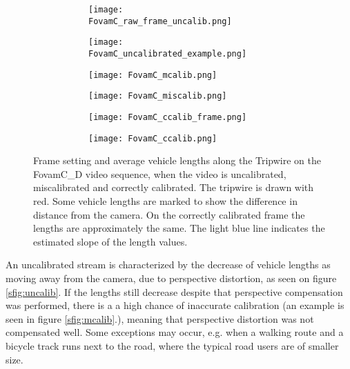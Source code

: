 \begin{figure}[!t]
	\centering
	\begin{subfigure}[b]{\textwidth}
		\begin{subfigure}[t]{0.45\textwidth}
		\texttt{[image: FovamC\_raw\_frame\_uncalib.png]}
		\end{subfigure}
	\quad
		\begin{subfigure}[t]{0.375\textwidth}
		\texttt{[image: FovamC\_uncalibrated\_example.png]}
		\end{subfigure}
	\end{subfigure}
	\hfill
	\begin{subfigure}[b]{\textwidth}
		\begin{subfigure}[t]{0.45\textwidth}
			\texttt{[image: FovamC\_mcalib.png]}
		\end{subfigure}
		\quad
		\begin{subfigure}[t]{0.375\textwidth}
			\texttt{[image: FovamC\_miscalib.png]}
		\end{subfigure}
	\end{subfigure}
	\hfill
	\begin{subfigure}[b]{\textwidth}
		\begin{subfigure}[t]{0.45\textwidth}
			\texttt{[image: FovamC\_ccalib\_frame.png]}
		\end{subfigure}
		\quad
		\begin{subfigure}[t]{0.375\textwidth}
			\texttt{[image: FovamC\_ccalib.png]}
		\end{subfigure}
	\end{subfigure}

	\caption{Frame setting and average vehicle lengths along the Tripwire on the FovamC\_D video sequence, when the video is uncalibrated, miscalibrated and correctly calibrated. The tripwire is drawn with red. Some vehicle lengths are marked to show the difference in distance from the camera. On the correctly calibrated frame the lengths are approximately the same. The light blue line indicates the estimated slope of the length values.\label{fig:calibration_versions}}
\end{figure}

An uncalibrated stream is characterized by the decrease of vehicle lengths as moving away from the camera, due to perspective distortion, as seen on figure \ref{sfig:uncalib}.
If the lengths still decrease despite that perspective compensation was performed, there is a a high chance of inaccurate calibration (an example is seen in figure \ref{sfig:mcalib}.), meaning that perspective distortion was not compensated well.
Some exceptions may occur, e.g. when a walking route and a bicycle track runs next to the road, where the typical road users are of smaller size.

